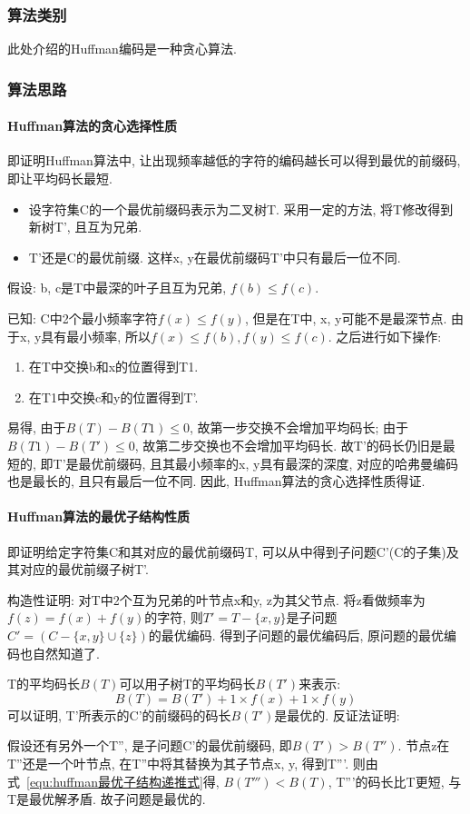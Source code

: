 \subsubsection{算法类别}
此处介绍的Huffman编码是一种贪心算法.

\subsubsection{算法思路}
\paragraph{Huffman算法的贪心选择性质}
即证明Huffman算法中, 让出现频率越低的字符的编码越长可以得到最优的前缀码,
即让平均码长最短.

\begin{itemize}
	\item 设字符集C的一个最优前缀码表示为二叉树T. 采用一定的方法, 将T修改得到新树T',
	      且互为兄弟.
	\item T'还是C的最优前缀. 这样x, y在最优前缀码T'中只有最后一位不同.
\end{itemize}

假设: b, c是T中最深的叶子且互为兄弟, $f(b)\leq f(c)$.\par
已知: C中2个最小频率字符$f(x)\leq f(y)$, 但是在T中, x, y可能不是最深节点. 由于x,
y具有最小频率, 所以$f(x)\leq f(b), f(y)\leq f(c)$. 之后进行如下操作:
\begin{enumerate}
	\item 在T中交换b和x的位置得到T1.
	\item 在T1中交换c和y的位置得到T'.
\end{enumerate}

易得, 由于$B(T) - B(T1)\leq 0$, 故第一步交换不会增加平均码长; 由于$B(T1) -
	B(T')\leq 0$, 故第二步交换也不会增加平均码长. 故T'的码长仍旧是最短的,
即T'是最优前缀码, 且其最小频率的x, y具有最深的深度, 对应的哈弗曼编码也是最长的,
且只有最后一位不同. 因此, Huffman算法的贪心选择性质得证.

\paragraph{Huffman算法的最优子结构性质} %
\label{par:Huffman算法的最优子结构性质}
即证明给定字符集C和其对应的最优前缀码T,
可以从中得到子问题C'(C的子集)及其对应的最优前缀子树T'.\par
构造性证明: 对T中2个互为兄弟的叶节点x和y, z为其父节点.
将z看做频率为$f(z)=f(x)+f(y)$的字符,
则$T'=T-\{x,y\}$是子问题$C'=(C-\{x,y\}\cup \{z\})$的最优编码.
得到子问题的最优编码后, 原问题的最优编码也自然知道了. \par
T的平均码长$B(T)$可以用子树T的平均码长$B(T')$来表示:
\begin{equation}
	B(T) = B(T') + 1\times f(x) + 1\times f(y)
	\label{equ:huffman最优子结构递推式}
\end{equation}
可以证明, T'所表示的C'的前缀码的码长$B(T')$是最优的. 反证法证明:\par
假设还有另外一个T'', 是子问题C'的最优前缀码, 即$B(T') > B(T'')$.
节点z在T''还是一个叶节点, 在T''中将其替换为其子节点x, y, 得到T'''.
则由式~\ref{equ:huffman最优子结构递推式}得, $B(T''') < B(T)$, T'''的码长比T更短,
与T是最优解矛盾. 故子问题是最优的.


